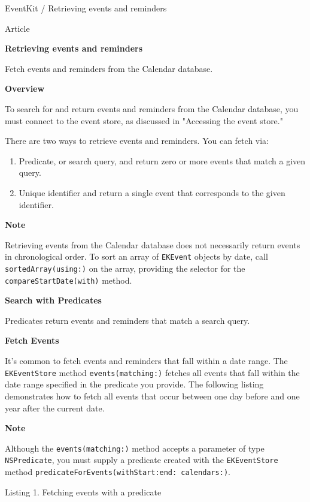 \documentclass{article}
\title{}
\author{}
\date{}
\begin{document}
EventKit / Retrieving events and reminders

Article

\textbf{Retrieving events and reminders}

Fetch events and reminders from the Calendar database.

\textbf{Overview}

To search for and return events and reminders from the Calendar database, you must connect to the event store, as discussed in "Accessing the event store."

There are two ways to retrieve events and reminders. You can fetch via:
\begin{enumerate}
    \item Predicate, or search query, and return zero or more events that match a given query.
    \item Unique identifier and return a single event that corresponds to the given identifier.
\end{enumerate}

\textbf{Note}

Retrieving events from the Calendar database does not necessarily return events in chronological order. To sort an array of \texttt{EKEvent} objects by date, call \texttt{sortedArray(using:)} on the array, providing the selector for the \texttt{compareStartDate(with)} method.

\textbf{Search with Predicates}

Predicates return events and reminders that match a search query.

\textbf{Fetch Events}

It's common to fetch events and reminders that fall within a date range. The \texttt{EKEventStore} method \texttt{events(matching:)} fetches all events that fall within the date range specified in the predicate you provide. The following listing demonstrates how to fetch all events that occur between one day before and one year after the current date.

\textbf{Note}

Although the \texttt{events(matching:)} method accepts a parameter of type \texttt{NSPredicate}, you must supply a predicate created with the \texttt{EKEventStore} method \texttt{predicateForEvents(withStart:end: calendars:)}.

Listing 1. Fetching events with a predicate
\end{document}
